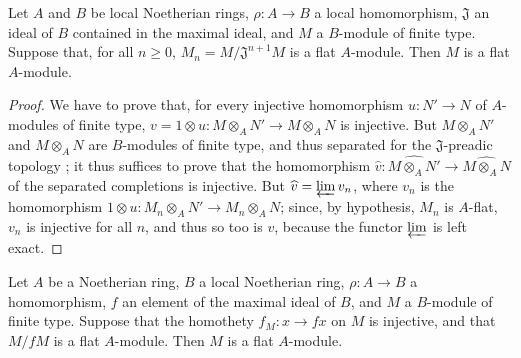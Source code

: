 \begin{proposition}[10.2.6]
\label{0.10.2.6}
Let $A$ and $B$ be local Noetherian rings, $\rho:A\to B$ a local homomorphism, $\mathfrak{J}$ an ideal of $B$ contained in the maximal ideal, and $M$ a $B$-module of finite type.
Suppose that, for all $n\geq0$, $M_n=M/\mathfrak{J}^{n+1}M$ is a flat $A$-module.
Then $M$ is a flat $A$-module.
\end{proposition}

\begin{proof}
\label{proof-0.10.2.6}
We have to prove that, for every injective homomorphism $u:N'\to N$ of $A$-modules of finite type, $v=1\otimes u:M\otimes_A N'\to M\otimes_A N$ is injective.
But $M\otimes_A N'$ and $M\otimes_A N$ are $B$-modules of finite type, and thus separated for the $\mathfrak{J}$-preadic topology ;
it thus suffices to prove that the homomorphism $\widehat{v}:\widehat{M\otimes_A N'}\to\widehat{M\otimes_A N}$ of the separated completions is injective.
But $\widehat{v}=\varprojlim v_n$, where $v_n$ is the homomorphism $1\otimes u:M_n\otimes_A N'\to M_n\otimes_A N$;
since, by hypothesis, $M_n$ is $A$-flat, $v_n$ is injective for all $n$, and thus so too is $v$, because the functor $\varprojlim$ is left exact.
\end{proof}

\begin{corollary}[10.2.7]
\label{0.10.2.7}
Let $A$ be a Noetherian ring, $B$ a local Noetherian ring, $\rho:A\to B$ a homomorphism, $f$ an element of the maximal ideal of $B$, and $M$ a $B$-module of finite type.
Suppose that the homothety $f_M:x\to fx$ on $M$ is injective, and that $M/fM$ is a flat $A$-module.
Then $M$ is a flat $A$-module.
\end{corollary}

